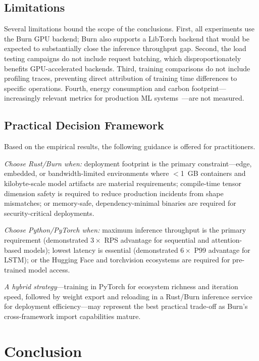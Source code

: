 \documentclass{ieeeaccess}
\begin{document}
\subsection{Limitations}

Several limitations bound the scope of the conclusions. First, all experiments use the Burn GPU backend; Burn also supports a LibTorch backend that would be expected to substantially close the inference throughput gap. Second, the load testing campaigns do not include request batching, which disproportionately benefits GPU-accelerated backends. Third, training comparisons do not include profiling traces, preventing direct attribution of training time differences to specific operations. Fourth, energy consumption and carbon footprint---increasingly relevant metrics for production ML systems~\cite{strubell2019energy}---are not measured.

\subsection{Practical Decision Framework}

Based on the empirical results, the following guidance is offered for practitioners.

\textit{Choose Rust/Burn when:} deployment footprint is the primary constraint---edge, embedded, or bandwidth-limited environments where $<$1~GB containers and kilobyte-scale model artifacts are material requirements; compile-time tensor dimension safety is required to reduce production incidents from shape mismatches; or memory-safe, dependency-minimal binaries are required for security-critical deployments.

\textit{Choose Python/PyTorch when:} maximum inference throughput is the primary requirement (demonstrated $3\times$ RPS advantage for sequential and attention-based models); lowest latency is essential (demonstrated $6\times$ P99 advantage for LSTM); or the Hugging Face and torchvision ecosystems are required for pre-trained model access.

\textit{A hybrid strategy}---training in PyTorch for ecosystem richness and iteration speed, followed by weight export and reloading in a Rust/Burn inference service for deployment efficiency---may represent the best practical trade-off as Burn's cross-framework import capabilities mature.

\section{Conclusion}
\label{sec:conclusion}
\end{document}
